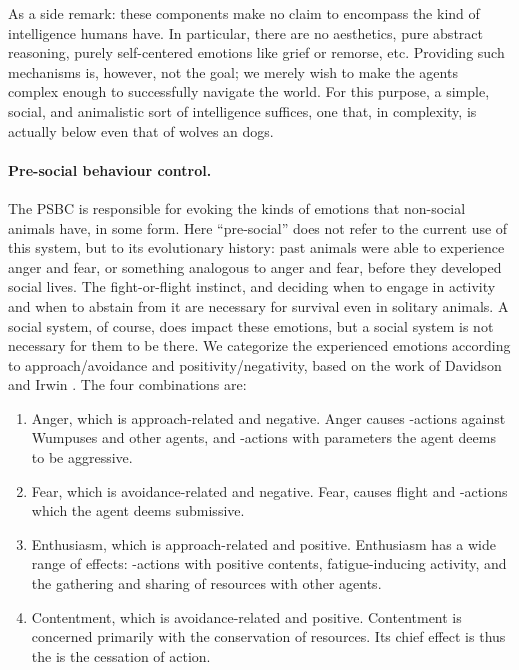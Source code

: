 As a side remark: these components make no claim to encompass the kind of intelligence humans have. In particular, there are no aesthetics, pure abstract reasoning,  purely self-centered emotions like grief or remorse, etc. Providing such mechanisms is, however, not the goal; we merely wish to make the agents complex enough to successfully navigate the world. For this purpose, a simple, social, and animalistic sort of intelligence suffices, one that, in complexity, is actually below even that of wolves an dogs.

\paragraph{Pre-social behaviour control.} The \textsc{PSBC} is responsible for evoking the kinds of emotions that non-social animals have, in some form. Here ``pre-social'' does not refer to the current use of this system, but to its evolutionary history: past animals were able to experience anger and fear, or something analogous to anger and fear, before they developed social lives. The fight-or-flight instinct, and deciding when to engage in activity and when to abstain from it are necessary for survival even in solitary animals. A social system, of course, does impact these emotions, but a social system is not necessary for them to be there.
We categorize the experienced emotions according to approach/avoidance and positivity/negativity, based on the work of Davidson and Irwin \cite{davidson1999}. The four combinations are:

\begin{enumerate}
	\item Anger, which is approach-related and negative. Anger causes -actions against Wumpuses and other agents, and -actions with parameters the agent deems to be aggressive.
	\item Fear, which is avoidance-related and negative. Fear, causes flight and -actions which the agent deems submissive.
	\item Enthusiasm, which is approach-related and positive. Enthusiasm has a wide range of effects: -actions with positive contents, fatigue-inducing activity, and the gathering and sharing of resources with other agents.
	\item Contentment, which is avoidance-related and positive. Contentment is concerned primarily with the conservation of resources. Its chief effect is thus the is the cessation of action.
\end{enumerate}

